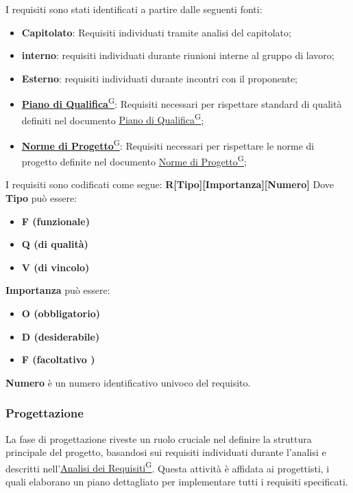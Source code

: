 I requisiti sono stati identificati a partire dalle seguenti fonti:
\begin{itemize}
    \item \textbf{Capitolato}: Requisiti individuati tramite analisi del capitolato;
    \item \textbf{interno}: requisiti individuati durante riunioni interne al gruppo di lavoro;
    \item \textbf{Esterno}: requisiti individuati durante incontri con il proponente;
    \item \href{https://code7crusaders.github.io/docs/RTB/documentazione_interna/glossario.html#piano-di-qualifica}{\textbf{Piano di Qualifica}\textsuperscript{G}}: Requisiti necessari per rispettare standard di qualità definiti nel documento \href{https://code7crusaders.github.io/docs/RTB/documentazione_interna/glossario.html#piano-di-qualifica}{Piano di Qualifica\textsuperscript{G}};
    \item \href{https://code7crusaders.github.io/docs/RTB/documentazione_interna/glossario.html#norme-di-progetto}{\textbf{Norme di Progetto}\textsuperscript{G}}: Requisiti necessari per rispettare le norme di progetto definite nel documento \href{https://code7crusaders.github.io/docs/RTB/documentazione_interna/glossario.html#norme-di-progetto}{Norme di Progetto\textsuperscript{G}};
\end{itemize}

I requisiti sono codificati come segue: \textbf{R[Tipo][Importanza][Numero]}
\newline
Dove \textbf{Tipo} può essere:
\begin{itemize}
    \item \textbf{F (funzionale)}
    \item \textbf{Q (di qualità)}
    \item \textbf{V (di vincolo)}
\end{itemize}
\textbf{Importanza} può essere:
\begin{itemize}
    \item \textbf{O (obbligatorio)}
    \item \textbf{D (desiderabile)}
    \item \textbf{F (facoltativo )}
\end{itemize}
\textbf{Numero} è un numero identificativo univoco del requisito.


\subsubsection{Progettazione}
La fase di progettazione riveste un ruolo cruciale nel definire la 
struttura principale del progetto, basandosi sui requisiti individuati durante 
l'analisi e descritti nell’\href{https://code7crusaders.github.io/docs/RTB/documentazione_interna/glossario.html#analisi-dei-requisiti}{Analisi dei Requisiti\textsuperscript{G}}. Questa attività è affidata ai progettisti, 
i quali elaborano un piano dettagliato per implementare tutti i requisiti specificati.

